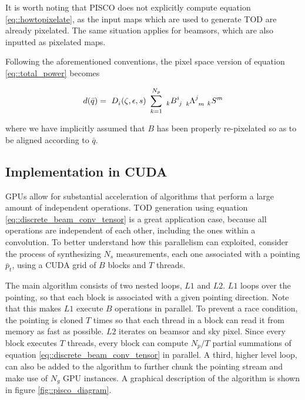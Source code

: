 \documentclass[a4paper,fleqn]{cas-dc}\sloppy
\begin{document}
	\noindent
	It is worth noting that PISCO does not explicitly compute equation \ref{eq::howtopixelate}, as the input maps which are used to generate TOD are already pixelated. The same situation applies for beamsors, which are also inputted as pixelated maps.
	
	Following the aforementioned conventions, the pixel space version of equation \ref{eq::total_power} becomes
	
	\begin{equation}
	\begin{aligned}
	d(\bar{q}) = \
	\tensor{D}{_{i}}(\zeta,\epsilon,s) \
	\sum_{k=1}^{N_p} \
	\tensor[_k]{B}{^i_j} \
	\tensor[_k]{\Lambda}{^j_m} \
	\tensor[_k]{S}{^m}
	\end{aligned}
	\label{eq::discrete_beam_conv_tensor}
	\end{equation}
	
	\noindent
	where we have implicitly assumed that $B$ has been properly re-pixelated so as to be aligned according to $\bar{q}$. 
	
	\subsection{Implementation in CUDA}
	
	GPUs allow for substantial acceleration of algorithms that perform a large amount of independent operations\cite{sanders2010cuda}. TOD generation using equation \ref{eq::discrete_beam_conv_tensor} is a great application case, because all operations are independent of each other, including the ones within a convolution. To better understand how this parallelism can exploited, consider the process of synthesizing $N_s$ measurements, each one associated with a pointing $\bar{p}_t$, using a CUDA grid of $B$ blocks and $T$ threads.
	
	The main algorithm consists of two nested loops, $L1$ and $L2$. $L1$ loops over the pointing, so that each block is associated with a given pointing direction. Note that this makes $L1$ execute $B$ operations in parallel. To prevent a race condition, the pointing is cloned $T$ times so that each thread in a block can read it from memory as fast as possible. $L2$ iterates on beamsor and sky pixel. Since every block executes $T$ threads, every block can compute $N_p/T$ partial summations of equation \ref{eq::discrete_beam_conv_tensor} in parallel. A third, higher level loop, can also be added to the algorithm to further chunk the pointing stream and make use of $N_g$ GPU instances. A graphical description of the algorithm is shown in figure \ref{fig::pisco_diagram}.
	
\end{document}

